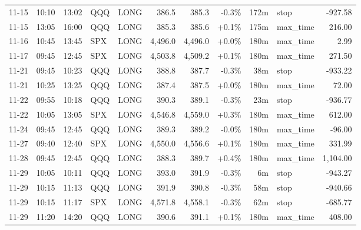 \documentclass[11pt,a4paper,twoside]{article}
\begin{document}
\begin{center}
\begin{longtable}{>{\color{txtmain}}l l l l l r r r r >{\color{txtmain}}l r}
11-15 & 10:10 & 13:02 & QQQ & LONG & 386.5 & 385.3 & \textcolor{lossred}{-0.3\%} & 172m & stop & \textcolor{lossred}{-927.58} \\
11-15 & 13:05 & 16:00 & QQQ & LONG & 385.3 & 385.6 & \textcolor{wingreen}{+0.1\%} & 175m & max\_time & \textcolor{wingreen}{216.00} \\
11-16 & 10:45 & 13:45 & SPX & LONG & 4,496.0 & 4,496.0 & \textcolor{wingreen}{+0.0\%} & 180m & max\_time & \textcolor{wingreen}{2.99} \\
11-17 & 09:45 & 12:45 & SPX & LONG & 4,503.8 & 4,509.2 & \textcolor{wingreen}{+0.1\%} & 180m & max\_time & \textcolor{wingreen}{271.50} \\
11-21 & 09:45 & 10:23 & QQQ & LONG & 388.8 & 387.7 & \textcolor{lossred}{-0.3\%} & 38m & stop & \textcolor{lossred}{-933.22} \\
11-21 & 10:25 & 13:25 & QQQ & LONG & 387.4 & 387.5 & \textcolor{wingreen}{+0.0\%} & 180m & max\_time & \textcolor{wingreen}{72.00} \\
11-22 & 09:55 & 10:18 & QQQ & LONG & 390.3 & 389.1 & \textcolor{lossred}{-0.3\%} & 23m & stop & \textcolor{lossred}{-936.77} \\
11-22 & 10:05 & 13:05 & SPX & LONG & 4,546.8 & 4,559.0 & \textcolor{wingreen}{+0.3\%} & 180m & max\_time & \textcolor{wingreen}{612.00} \\
11-24 & 09:45 & 12:45 & QQQ & LONG & 389.3 & 389.2 & \textcolor{lossred}{-0.0\%} & 180m & max\_time & \textcolor{lossred}{-96.00} \\
11-27 & 09:40 & 12:40 & SPX & LONG & 4,550.0 & 4,556.6 & \textcolor{wingreen}{+0.1\%} & 180m & max\_time & \textcolor{wingreen}{331.99} \\
11-28 & 09:45 & 12:45 & QQQ & LONG & 388.3 & 389.7 & \textcolor{wingreen}{+0.4\%} & 180m & max\_time & \textcolor{wingreen}{1,104.00} \\
11-29 & 10:05 & 10:11 & QQQ & LONG & 393.0 & 391.9 & \textcolor{lossred}{-0.3\%} & 6m & stop & \textcolor{lossred}{-943.27} \\
11-29 & 10:15 & 11:13 & QQQ & LONG & 391.9 & 390.8 & \textcolor{lossred}{-0.3\%} & 58m & stop & \textcolor{lossred}{-940.66} \\
11-29 & 10:15 & 11:17 & SPX & LONG & 4,571.8 & 4,558.1 & \textcolor{lossred}{-0.3\%} & 62m & stop & \textcolor{lossred}{-685.77} \\
11-29 & 11:20 & 14:20 & QQQ & LONG & 390.6 & 391.1 & \textcolor{wingreen}{+0.1\%} & 180m & max\_time & \textcolor{wingreen}{408.00} \\

\end{longtable}
\end{center}
\end{document}
